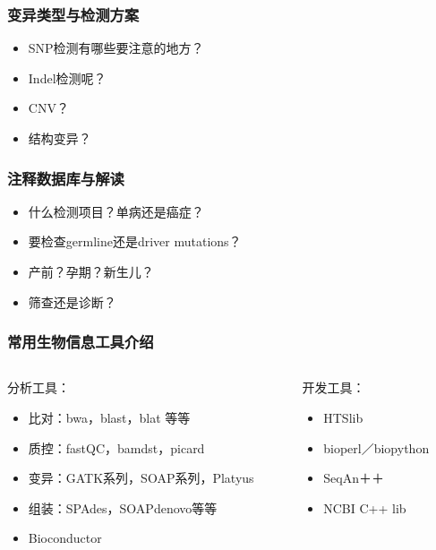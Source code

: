 \documentclass[12pt]{beamer}
\begin{document}
\begin{frame}\frametitle{变异类型与检测方案}
\begin{itemize}
\item SNP检测有哪些要注意的地方？
\item Indel检测呢？
\item CNV？
\item 结构变异？
\end{itemize}
\end{frame}

\begin{frame}\frametitle{注释数据库与解读}
  \begin{itemize}
\item 什么检测项目？单病还是癌症？
\item 要检查germline还是driver mutations？
\item 产前？孕期？新生儿？
\item 筛查还是诊断？  
\end{itemize}

\end{frame}
\begin{frame}\frametitle{常用生物信息工具介绍}
  \begin{columns}
    \begin{column}{0.5\textwidth}
      分析工具：
      \begin{itemize}
      \item 比对：bwa，blast，blat 等等
      \item 质控：fastQC，bamdst，picard
      \item 变异：GATK系列，SOAP系列，Platyus
      \item 组装：SPAdes，SOAPdenovo等等
      \item Bioconductor
      \end{itemize}
    \end{column}

    \begin{column}{0.5\textwidth}
      开发工具：
      \begin{itemize}
      \item HTSlib
      \item bioperl／biopython
      \item SeqAn＋＋
      \item NCBI C++ lib
      \end{itemize}
    \end{column}
    
    \end{columns}
  
  \end{frame}
\end{document}
